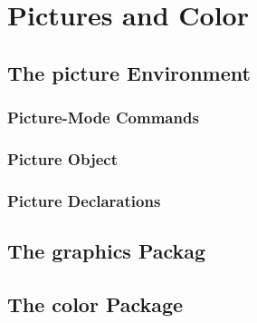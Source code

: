 \section{Pictures and Color}
\subsection{The picture Environment}
\subsubsection{Picture-Mode Commands}
\subsubsection{Picture Object}
\subsubsection{Picture Declarations}


\subsection{The graphics Packag}


\subsection{The color Package}